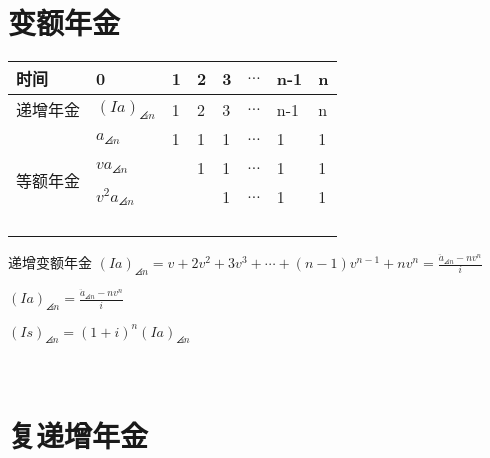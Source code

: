 \section{变额年金}
\begin{table}[htbp]
	\begin{tabular}{|l|l|l|l|l|l|l|l|}
		\hline
		时间                    & 0                   & 1 & 2 & 3 & $\dots$ & n-1 & n \\ \hline
		递增年金                  & $(Ia)_{\angles{n}}$ & 1 & 2 & 3 & $\dots$ & n-1 & n \\ \hline
		\multirow{7}{*}{等额年金} & $a_{\angles{n}}$    & 1 & 1 & 1 & $\dots$ & 1   & 1 \\ \cline{2-8} 
		&     $va_{\angles{n}}$                &   &  1 & 1  &   $\dots$      & 1    &1   \\ \cline{2-8} 
		&    $v^2 a_{\angles{n}}$                  &   &   & 1  &      $\dots$     &  1   &  1 \\ \cline{2-8} 
		&                     &   &   &   &         &     &   \\ \cline{2-8} 
		&                     &   &   &   &         &     &   \\ \cline{2-8} 
		&                     &   &   &   &         &     &   \\ \cline{2-8} 
		&                     &   &   &   &         &     &   \\ \hline
	\end{tabular}
\end{table}
\begin{definition}{递增变额年金}
\noindent $(Ia)_{\angles{n}}=v+2 v^{2}+3 v^{3}+\cdots+(n-1) v^{n-1}+n v^{n}=\frac{\ddot{a}_{\angles{n}}-n v^{n}}{i}$
\end{definition}
\begin{remark}
	$(Ia)_{\angles{n}}=\frac{\ddot{a}_{\angles{n}}-n v^{n}}{i}$
\end{remark}
\noindent $(Is)_{\angles{n}}=(1+i)^n(Ia)_{\angles{n}}$\\
 \\
\section{复递增年金}

